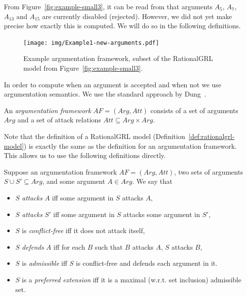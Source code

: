 
From Figure~\ref{fig:example-small3}, it can be read from that arguments $A_5$, $A_7$, $A_{13}$ and $A_{15}$ are currently disabled (rejected). However, we did not yet make precise how exactly this is computed. We will do so in the following definitions.
\begin{figure}[b]
\centering
\texttt{[image: img/Example1-new-arguments.pdf]}
\caption{Example argumentation framework, subset of the RationalGRL model from Figure~\ref{fig:example-small3}.}
\label{fig:goalmodeling:arg2}
\end{figure}
In order to compute when an argument is accepted and when not we use argumentation semantics.  We use the standard approach by Dung~\cite{Dung1995}. 

\begin{definition}
\label{def:argumentation-framework}
An \emph{argumentation framework} $AF=(Arg,Att)$ consists of a set of arguments $Arg$ and a set of attack relations $Att\subseteq Arg\times Arg.$
\end{definition}

Note that the definition of a RationalGRL model (Definition~\ref{def:rationalgrl-model}) is exactly the same as the definition for an argumentation framework. This allows us to use the following definitions directly.

\begin{definition} \label{def:semantics}Suppose an argumentation framework $AF=(Arg,Att)$, two sets of arguments $S\cup S'\subseteq Arg$, and some argument $A\in Arg$. We say that
\begin{itemize}
\item $S$ \emph{attacks} $A$ iff some argument in $S$ attacks $A$,
\item $S$ \emph{attacks} $S'$ iff some argument in $S$ attacks some argument in $S'$,
\item $S$ is \emph{conflict-free} iff it does not attack itself,
\item $S$ \emph{defends} $A$ iff for each $B$ such that $B$ attacks $A$, $S$ attacks $B$,
\item $S$ is \emph{admissible} iff $S$ is conflict-free and defends each argument in it.
\item $S$ is a \emph{preferred extension} iff it is a maximal (w.r.t. set inclusion) admissible set.
\end{itemize}
\end{definition}

